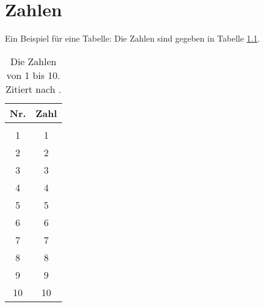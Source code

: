 \chapter{Zahlen}
Ein Beispiel f\"ur eine Tabelle: Die Zahlen sind gegeben in Tabelle \ref{tab-zahlen}.

\begin{table}
\begin{center}
\begin{tabular}{c|c}
Nr. & Zahl \\
\hline{} \\
1 & 1\\
2 & 2\\
3 & 3\\
4 & 4\\
5 & 5\\
6 & 6\\
7 & 7\\
8 & 8\\
9 & 9\\
10 & 10 \\
\end{tabular}
\end{center}
\caption{Die Zahlen von 1 bis 10. Zitiert nach \citealp{HaugKoch2004}.}
\label{tab-zahlen}
\end{table} 
